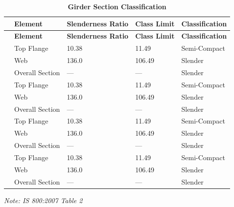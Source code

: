 \documentclass[12pt,a4paper]{report}
\numberwithin{table}{chapter}
\numberwithin{figure}{chapter}
\begin{document}
\vspace{1em}
\begin{longtable}{|C{2.5cm}|L{3cm}|C{3.5cm}|C{2.5cm}|>{\centering\arraybackslash}p{4.0cm}|}
\caption{\textbf{Girder Section Classification}}
\hline
\textbf{} & \textbf{Element} & \textbf{Slenderness Ratio} & \textbf{Class Limit} & \textbf{Classification} \\[6pt]
\hline
\endfirsthead
\textbf{} & \textbf{Element} & \textbf{Slenderness Ratio} & \textbf{Class Limit} & \textbf{Classification} \\[6pt]
\hline
\endhead
{} & Top Flange & 10.38 & 11.49 & Semi-Compact \\[6pt]
 & Web & 136.0 & 106.49 & Slender \\[6pt]
 & Overall Section & --- & --- & Slender \\[6pt]
\hline
{} & Top Flange & 10.38 & 11.49 & Semi-Compact \\[6pt]
 & Web & 136.0 & 106.49 & Slender \\[6pt]
 & Overall Section & --- & --- & Slender \\[6pt]
\hline
{} & Top Flange & 10.38 & 11.49 & Semi-Compact \\[6pt]
 & Web & 136.0 & 106.49 & Slender \\[6pt]
 & Overall Section & --- & --- & Slender \\[6pt]
\hline
{} & Top Flange & 10.38 & 11.49 & Semi-Compact \\[6pt]
 & Web & 136.0 & 106.49 & Slender \\[6pt]
 & Overall Section & --- & --- & Slender \\[6pt]
\hline
\end{longtable}
\noindent\textit{Note: IS 800:2007 Table 2}
\end{document}
